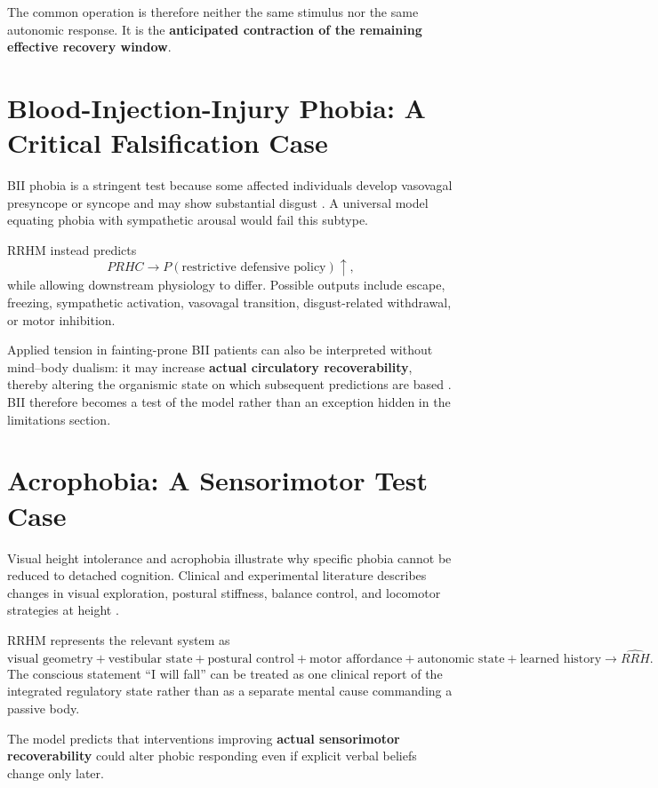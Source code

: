 \documentclass[11pt]{article}
\begin{document}
The common operation is therefore neither the same stimulus nor the same autonomic response. It is the \textbf{anticipated contraction of the remaining effective recovery window}.

\section{Blood-Injection-Injury Phobia: A Critical Falsification Case}

BII phobia is a stringent test because some affected individuals develop vasovagal presyncope or syncope and may show substantial disgust \cite{ducasse2013,ritz2010,ayala2009}. A universal model equating phobia with sympathetic arousal would fail this subtype.

RRHM instead predicts
\[
PRHC\rightarrow P(\text{restrictive defensive policy})\uparrow,
\]
while allowing downstream physiology to differ. Possible outputs include escape, freezing, sympathetic activation, vasovagal transition, disgust-related withdrawal, or motor inhibition.

Applied tension in fainting-prone BII patients can also be interpreted without mind--body dualism: it may increase \textbf{actual circulatory recoverability}, thereby altering the organismic state on which subsequent predictions are based \cite{ayala2009}. BII therefore becomes a test of the model rather than an exception hidden in the limitations section.

\section{Acrophobia: A Sensorimotor Test Case}

Visual height intolerance and acrophobia illustrate why specific phobia cannot be reduced to detached cognition. Clinical and experimental literature describes changes in visual exploration, postural stiffness, balance control, and locomotor strategies at height \cite{huppert2020,wuehr2015}.

RRHM represents the relevant system as
\[
\text{visual geometry}+\text{vestibular state}+\text{postural control}+\text{motor affordance}+\text{autonomic state}+\text{learned history}\rightarrow\widehat{RRH}.
\]
The conscious statement ``I will fall'' can be treated as one clinical report of the integrated regulatory state rather than as a separate mental cause commanding a passive body.

The model predicts that interventions improving \textbf{actual sensorimotor recoverability} could alter phobic responding even if explicit verbal beliefs change only later.
\end{document}
